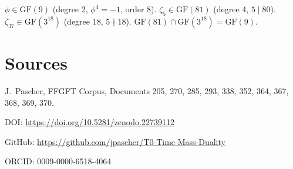 \documentclass[12pt,oneside]{book}
\begin{document}
$\phi \in \text{GF}(9)$ (degree 2, $\phi^4 = -1$, order 8). $\zeta_5 \in \text{GF}(81)$ (degree 4, $5 \mid 80$). $\zeta_{37} \in \text{GF}(3^{18})$ (degree 18, $5 \nmid 18$). $\text{GF}(81) \cap \text{GF}(3^{18}) = \text{GF}(9)$.

\section{Sources}

J.~Pascher, FFGFT Corpus, Documents 205, 270, 285, 293, 338, 352, 364, 367, 368, 369, 370.

DOI: \url{https://doi.org/10.5281/zenodo.22739112}

GitHub: \url{https://github.com/jpascher/T0-Time-Mass-Duality}

ORCID: 0009-0000-6518-4064
\end{document}
